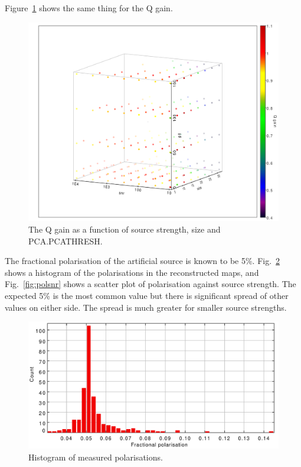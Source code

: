 \documentclass[twoside,11pt]{starlink}
\begin{document}
Figure~\ref{fig:qgain} shows the same thing for the Q gain.

\begin{figure}
\includegraphics[width=0.9\columnwidth]{figs/qgain}
\caption{The Q gain as a function of source strength, size and
PCA.PCATHRESH.}
\label{fig:qgain}
\end{figure}

The fractional polarisation of the artificial source is known to be 5\%.
Fig.~\ref{fig:polhist} shows a histogram of the polarisations in the
reconstructed maps, and Fig.~\ref{fig:polsnr} shows a scatter plot of
polarisation against source strength. The expected 5\% is the most common
value but there is significant spread of other values on either side. The
spread is much greater for smaller source strengths.

\begin{figure}
\includegraphics[width=0.9\columnwidth]{figs/polhist}
\caption{Histogram of measured polarisations.}
\label{fig:polhist}
\end{figure}
\end{document}
